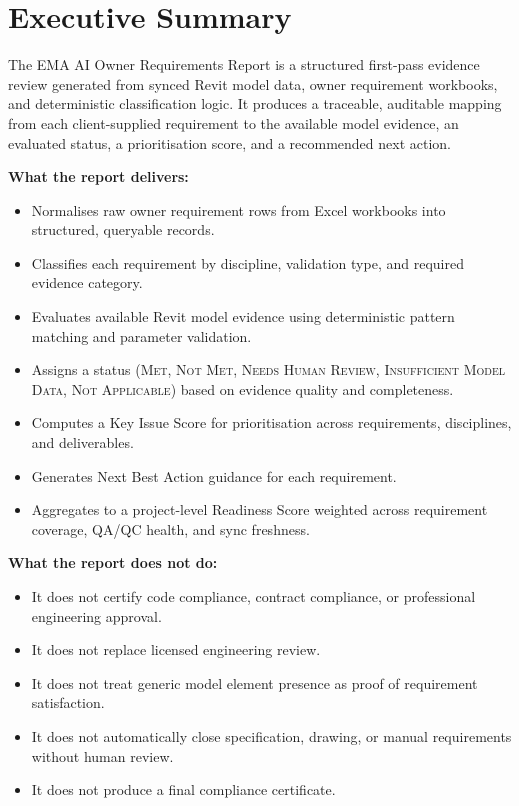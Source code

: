 \documentclass[10pt,letterpaper]{article}
\newcommand{\strong}[1]{\textbf{\textcolor{emaNavy}{#1}}}
\begin{document}
\tableofcontents
\newpage

\section{Executive Summary}

The EMA AI Owner Requirements Report is a structured first-pass evidence review generated from
synced Revit model data, owner requirement workbooks, and deterministic classification logic. It
produces a traceable, auditable mapping from each client-supplied requirement to the available model
evidence, an evaluated status, a prioritisation score, and a recommended next action.

\strong{What the report delivers:}
\begin{itemize}
  \item Normalises raw owner requirement rows from Excel workbooks into structured, queryable records.
  \item Classifies each requirement by discipline, validation type, and required evidence category.
  \item Evaluates available Revit model evidence using deterministic pattern matching and parameter
        validation.
  \item Assigns a status (\textsc{Met}, \textsc{Not Met}, \textsc{Needs Human Review},
        \textsc{Insufficient Model Data}, \textsc{Not Applicable}) based on evidence quality and
        completeness.
  \item Computes a Key Issue Score for prioritisation across requirements, disciplines, and
        deliverables.
  \item Generates Next Best Action guidance for each requirement.
  \item Aggregates to a project-level Readiness Score weighted across requirement coverage, QA/QC
        health, and sync freshness.
\end{itemize}

\strong{What the report does not do:}
\begin{itemize}
  \item It does not certify code compliance, contract compliance, or professional engineering
        approval.
  \item It does not replace licensed engineering review.
  \item It does not treat generic model element presence as proof of requirement satisfaction.
  \item It does not automatically close specification, drawing, or manual requirements without human
        review.
  \item It does not produce a final compliance certificate.
\end{itemize}
\end{document}
